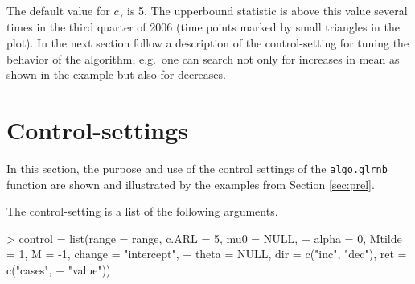 \documentclass[a4paper,11pt]{article}
\begin{document}
The default value for $c_{\gamma}$ is 5. The upperbound statistic is above this value several times in the third quarter of 2006 (time points marked by small triangles in the plot). 
In the next section follow a description of the control-setting for tuning the behavior of the algorithm, e.g.\ one can search not only for increases in mean as shown in the example but also for decreases.






   
\section{Control-settings}\label{sec:control}

In this section, the purpose and use of the control settings of the \verb+algo.glrnb+ function  are shown and illustrated by the examples from Section \ref{sec:prel}.


The control-setting is a list of the following arguments.

\begin{Schunk}
\begin{Sinput}
> control = list(range = range, c.ARL = 5, mu0 = NULL, 
+     alpha = 0, Mtilde = 1, M = -1, change = "intercept", 
+     theta = NULL, dir = c("inc", "dec"), ret = c("cases", 
+         "value"))
\end{Sinput}
\end{Schunk}
\end{document}
